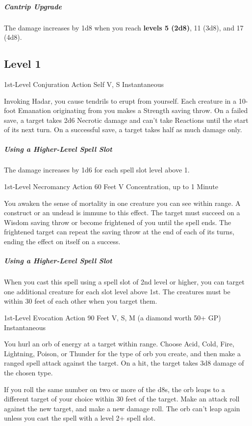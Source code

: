 \documentclass[letterpaper,openany,oneside,twocolumn]{book}
\begin{document}
\subparagraph*{Cantrip Upgrade} The damage increases by 1d8 when you reach \textbf{levels 5 (2d8)}, 11 (3d8), and 17 (4d8).

\subsection*{Level 1}
	{1st-Level Conjuration}
	{Action}
	{Self}
	{V, S}
	{Instantaneous}

Invoking Hadar, you cause tendrils to erupt from yourself. Each creature in a 10-foot Emanation originating from you makes a Strength saving throw. On a failed save, a target takes 2d6 Necrotic damage and can't take Reactions until the start of its next turn. On a successful save, a target takes half as much damage only.

\subparagraph*{Using a Higher-Level Spell Slot} The damage increases by 1d6 for each spell slot level above 1.

	{1st-Level Necromancy}
	{Action}
	{60 Feet}
	{V}
	{Concentration, up to 1 Minute}

You awaken the sense of mortality in one creature you can see within range. A construct or an undead is immune to this effect. The target must succeed on a Wisdom saving throw or become frightened of you until the spell ends. The frightened target can repeat the saving throw at the end of each of its turns, ending the effect on itself on a success.

\subparagraph*{Using a Higher-Level Spell Slot} When you cast this spell using a spell slot of 2nd level or higher, you can target one additional creature for each slot level above 1st. The creatures must be within 30 feet of each other when you target them.

	{1st-Level Evocation}
	{Action}
	{90 Feet}
	{V, S, M (a diamond worth 50+ GP)}
	{Instantaneous}

You hurl an orb of energy at a target within range. Choose Acid, Cold, Fire, Lightning, Poison, or Thunder for the type of orb you create, and then make a ranged spell attack against the target. On a hit, the target takes 3d8 damage of the chosen type.

If you roll the same number on two or more of the d8s, the orb leaps to a different target of your choice within 30 feet of the target. Make an attack roll against the new target, and make a new damage roll. The orb can't leap again unless you cast the spell with a level 2+ spell slot.
\end{document}
